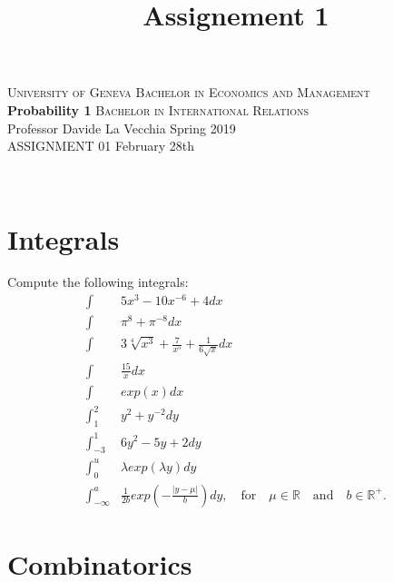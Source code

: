 \documentclass[12pt,a4paper,titlepage]{article}\usepackage[]{graphicx}\usepackage[]{color}
\title{Assignement 1}
\begin{document}
\noindent \textsc{University of Geneva}     \hfill \textsc{Bachelor in Economics and Management} \\
\textbf{Probability 1}                      \hfill \textsc{Bachelor in International Relations} \\
Professor Davide La Vecchia                 \hfill Spring 2019  \\
ASSIGNMENT 01                               \hfill   February 28th



\noindent
\makebox[\linewidth]{\rule{\textwidth}{0.4pt}}\\[1.5ex]





\section{Integrals}


Compute the following integrals: \\
\begin{align*}
\int& 5x^{3}-10x^{-6}+4 dx \\
\int&  \pi^{8}+\pi^{-8} dx \\
\int& 3\sqrt[4]{x^{3}}+\frac{7}{x^{5}}+\frac{1}{6\sqrt{x}}dx \\
\int& \frac{15}{x}dx \\
\int & exp(x)dx\\
\int_{1}^{2}& y^{2}+y^{-2}dy \\
\int_{-3}^{1}& 6y^{2}-5y+2dy \\
\int_{0}^{u}& \lambda exp(\lambda y) dy \\
\int_{-\infty}^{a}& \frac{1}{2b} exp\left (-\frac{|y-\mu|}{b}\right) dy, \quad \text{for} \quad \mu \in \mathbb{R} \quad \text{and} \quad b \in \mathbb{R}^{+}.
\end{align*}


\vspace{1cm}


\section{Combinatorics}
\end{document}
